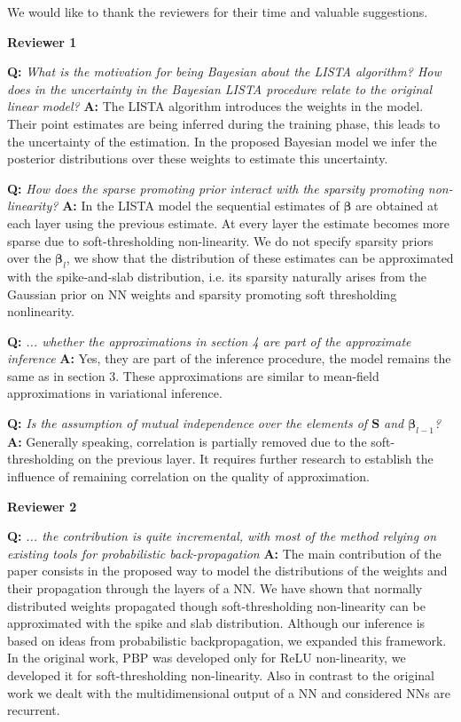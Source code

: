 \documentclass{article}
\begin{document}
We would like to thank the reviewers for their time and valuable suggestions.

\textbf{Reviewer 1}

\textbf{Q:} \textit{What is the motivation for being Bayesian about the LISTA algorithm? How does in the uncertainty in the Bayesian LISTA procedure relate to the original linear model?}
\textbf{A:} The LISTA algorithm introduces the weights in the model. Their point estimates are being inferred during the training phase, this leads to the uncertainty of the estimation. In the proposed Bayesian model we infer the posterior distributions over these weights to estimate this uncertainty.

\textbf{Q:} \textit{How does the sparse promoting prior interact with the sparsity promoting non-linearity?}
\textbf{A:} In the LISTA model the sequential estimates of $\boldsymbol{\beta}$ are obtained at each layer using the previous estimate. At every layer the estimate becomes more sparse due to soft-thresholding non-linearity. We do not specify sparsity priors over the $\boldsymbol{\beta}_l$, we show that the distribution of these estimates can be approximated with the spike-and-slab distribution, i.e. its sparsity naturally arises from the Gaussian prior on NN weights and sparsity promoting soft thresholding nonlinearity.

\textbf{Q:} \textit{... whether the approximations in section 4 are part of the approximate inference}
\textbf{A:} Yes, they are part of the inference procedure, the model remains the same as in section 3. These approximations are similar to mean-field approximations in variational inference.

\textbf{Q:} \textit{Is the assumption of mutual independence over the elements of $\mathbf{S}$ and $\boldsymbol{\beta}_{l-1}$?}
\textbf{A:} Generally speaking, correlation is partially removed due to the soft-thresholding on the previous layer. It requires further research to establish the influence of remaining correlation on the quality of approximation.

\textbf{Reviewer 2}

\textbf{Q:} \textit{... the contribution is quite incremental, with most of the method relying on existing tools for probabilistic back-propagation}
\textbf{A:} The main contribution of the paper consists in the proposed way to model the distributions of the weights and their propagation through the layers of a NN. We have shown that normally distributed weights propagated though soft-thresholding non-linearity can be approximated with the spike and slab distribution. Although our inference is based on ideas from probabilistic backpropagation, we expanded this framework. In the original work, PBP was developed only for ReLU non-linearity, we developed it for soft-thresholding non-linearity. Also in contrast to the original work we dealt with the multidimensional output of a NN and considered NNs are recurrent.
\end{document}
